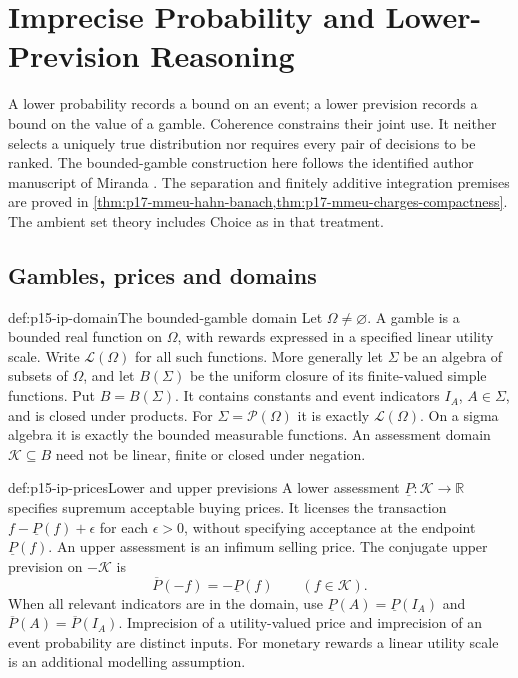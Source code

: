 \chapter{Imprecise Probability and Lower-Prevision Reasoning}
\label{sec:p15-imprecise-probability}

A lower probability records a bound on an event; a lower prevision records
a bound on the value of a gamble. Coherence constrains their joint use.
It neither selects a uniquely true distribution nor requires every pair of
decisions to be ranked. The bounded-gamble construction here follows the
identified author manuscript of Miranda
\cite[author manuscript, §§2--4]{MirandaCoherentLowerPrevisionsCapture}.
The separation and finitely additive integration premises are proved in
\cref{thm:p17-mmeu-hahn-banach,thm:p17-mmeu-charges-compactness}.
The ambient set theory includes Choice as in that treatment.

\section{Gambles, prices and domains}
\label{sec:p15-ip-domains}

\begin{hbdefinition}{def:p15-ip-domain}{The bounded-gamble domain}
Let \(\Omega\ne\varnothing\). A gamble is a bounded real function on
\(\Omega\), with rewards expressed in a specified linear utility scale.
Write \(\mathcal L(\Omega)\) for all such functions.
More generally let \(\Sigma\) be an algebra of subsets of \(\Omega\),
and let \(B(\Sigma)\) be the uniform closure of its finite-valued simple
functions. Put \(B=B(\Sigma)\). It contains constants and event indicators
\(I_A\), \(A\in\Sigma\), and is closed under products.
For \(\Sigma=\mathcal P(\Omega)\) it is exactly \(\mathcal L(\Omega)\).
On a sigma algebra it is exactly the bounded measurable functions.
An assessment domain \(\mathcal K\subseteq B\) need not be linear,
finite or closed under negation.
\end{hbdefinition}

\begin{hbdefinition}{def:p15-ip-prices}{Lower and upper previsions}
A lower assessment \(\underline P:\mathcal K\to\mathbb R\) specifies
supremum acceptable buying prices. It licenses the transaction
\(f-\underline P(f)+\epsilon\) for each \(\epsilon>0\), without
specifying acceptance at the endpoint \(\underline P(f)\).
An upper assessment is an infimum selling price. The conjugate upper
prevision on \(-\mathcal K\) is
\[
 \overline P(-f)=-\underline P(f)\qquad(f\in\mathcal K).
\]
When all relevant indicators are in the domain, use
\(\underline P(A)=\underline P(I_A)\) and
\(\overline P(A)=\overline P(I_A)\).
Imprecision of a utility-valued price and imprecision of an event
probability are distinct inputs. For monetary rewards a linear utility
scale is an additional modelling assumption.
\end{hbdefinition}

